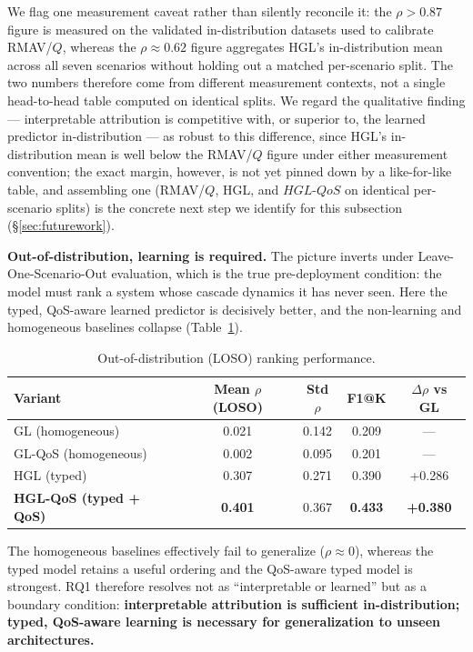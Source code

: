 \documentclass[review]{elsarticle}
\begin{document}
We flag one measurement caveat rather than silently reconcile it: the $\rho>0.87$ figure is measured
on the validated in-distribution datasets used to calibrate RMAV/$Q$, whereas the $\rho\approx0.62$
figure aggregates HGL's in-distribution mean across all seven scenarios without holding out a
matched per-scenario split. The two numbers therefore come from different measurement contexts, not
a single head-to-head table computed on identical splits. We regard the qualitative finding ---
interpretable attribution is competitive with, or superior to, the learned predictor
in-distribution --- as robust to this difference, since HGL's in-distribution mean is well below the
RMAV/$Q$ figure under either measurement convention; the exact margin, however, is not yet pinned
down by a like-for-like table, and assembling one (RMAV/$Q$, HGL, and $HGL\text{-}QoS$ on identical
per-scenario splits) is the concrete next step we identify for this subsection (\S\ref{sec:futurework}).

\textbf{Out-of-distribution, learning is required.} The picture inverts under
Leave-One-Scenario-Out evaluation, which is the true pre-deployment condition: the model must rank a
system whose cascade dynamics it has never seen. Here the typed, QoS-aware learned predictor is
decisively better, and the non-learning and homogeneous baselines collapse (Table~\ref{tab:loso}).

\begin{table}[h]
\centering
\caption{Out-of-distribution (LOSO) ranking performance.}
\label{tab:loso}
\begin{tabular}{@{}lcccc@{}}
\toprule
Variant & Mean $\rho$ (LOSO) & Std $\rho$ & F1@K & $\Delta\rho$ vs GL \\
\midrule
GL (homogeneous) & 0.021 & 0.142 & 0.209 & --- \\
GL-QoS (homogeneous) & 0.002 & 0.095 & 0.201 & --- \\
HGL (typed) & 0.307 & 0.271 & 0.390 & +0.286 \\
\textbf{HGL-QoS (typed + QoS)} & \textbf{0.401} & 0.367 & \textbf{0.433} & \textbf{+0.380} \\
\bottomrule
\end{tabular}
\end{table}

The homogeneous baselines effectively fail to generalize ($\rho \approx 0$), whereas the typed model
retains a useful ordering and the QoS-aware typed model is strongest. RQ1 therefore resolves not as
``interpretable or learned'' but as a boundary condition: \textbf{interpretable attribution is
sufficient in-distribution; typed, QoS-aware learning is necessary for generalization to unseen
architectures.}
\end{document}
